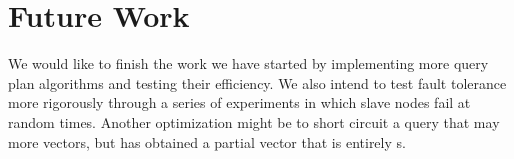 \section{Future Work}
We would like to finish the work we have started by implementing more
query plan algorithms and testing their efficiency. We also intend to test
fault tolerance more rigorously through a series of experiments in which
slave nodes fail at random times. Another optimization might be to short circuit
a query that may  more vectors, but has obtained a partial vector that
is entirely s.
